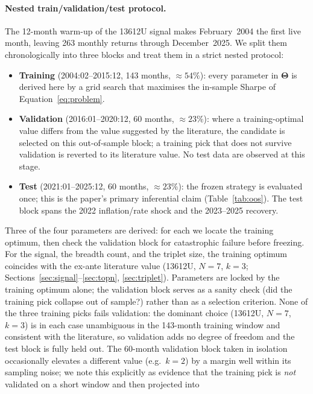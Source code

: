 \paragraph{Nested train/validation/test protocol.}
The 12-month warm-up of the 13612U signal makes February~2004 the first live
month, leaving 263 monthly returns through December~2025. We split them
chronologically into three blocks and treat them in a strict nested protocol:
\begin{itemize}
    \item \textbf{Training} (2004:02--2015:12, 143 months, $\approx 54\%$):
          every parameter in $\boldsymbol{\Theta}$ is derived here by a
          grid search that maximises the in-sample Sharpe of
          Equation~\eqref{eq:problem}.
    \item \textbf{Validation} (2016:01--2020:12, 60 months, $\approx 23\%$):
          where a training-optimal value differs from the value suggested by the
          literature, the candidate is selected on this out-of-sample block;
          a training pick that does not survive validation is reverted to its
          literature value. No test data are observed at this stage.
    \item \textbf{Test} (2021:01--2025:12, 60 months, $\approx 23\%$):
          the frozen strategy is evaluated once; this is the paper's primary
          inferential claim (Table~\ref{tab:oos}). The test block spans the 2022
          inflation/rate shock and the 2023--2025 recovery.
\end{itemize}
Three of the four parameters are derived: for each we locate the training
optimum, then check the validation block for catastrophic failure before freezing.
For the signal, the breadth count, and the triplet size, the training optimum
coincides with the ex-ante literature value (13612U, $N=7$, $k=3$;
Sections~\ref{sec:signal}--\ref{sec:topn}, \ref{sec:triplet}).
Parameters are locked by the training optimum alone; the validation block
serves as a sanity check (did the training pick collapse out of sample?) rather
than as a selection criterion. None of the three training picks fails validation:
the dominant choice (13612U, $N=7$, $k=3$) is in each case unambiguous in the
143-month training window and consistent with the literature, so validation adds
no degree of freedom and the test block is fully held out. The 60-month validation
block taken in isolation occasionally elevates a different value (e.g.\ $k=2$) by
a margin well within its sampling noise; we note this explicitly as evidence that
the training pick is \emph{not} validated on a short window and then projected into

